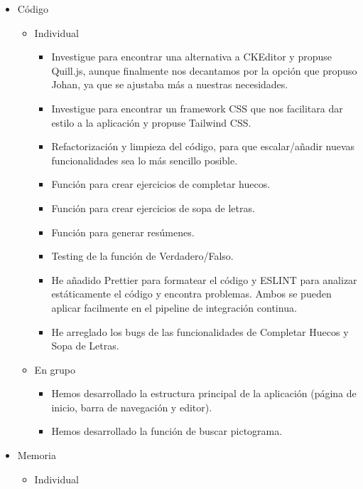\begin{itemize}
    \item Código
          \begin{itemize}
              \item Individual
                    \begin{itemize}
                        \item Investigue para encontrar una alternativa a CKEditor y propuse Quill.js, aunque finalmente nos decantamos por la opción que propuso Johan, ya que se ajustaba más a nuestras necesidades.
                        \item Investigue para encontrar un framework CSS que nos facilitara dar estilo a la aplicación y propuse Tailwind CSS.
                        \item Refactorización y limpieza del código, para que escalar/añadir nuevas funcionalidades sea lo más sencillo posible.
                        \item Función para crear ejercicios de completar huecos.
                        \item Función para crear ejercicios de sopa de letras.
                        \item Función para generar resúmenes.
                        \item Testing de la función de Verdadero/Falso.
                        \item He añadido Prettier para formatear el código y ESLINT para analizar estáticamente el código y encontra problemas. Ambos se pueden aplicar facilmente en el pipeline de integración continua.
                        \item He arreglado los bugs de las funcionalidades de Completar Huecos y Sopa de Letras.
                    \end{itemize}
              \item En grupo
                    \begin{itemize}
                        \item Hemos desarrollado la estructura principal de la aplicación (página de inicio, barra de navegación y editor).
                        \item Hemos desarrollado la función de buscar pictograma.
                    \end{itemize}
          \end{itemize}
    \item Memoria
          \begin{itemize}
              \item Individual

\end{itemize}
\end{itemize}
